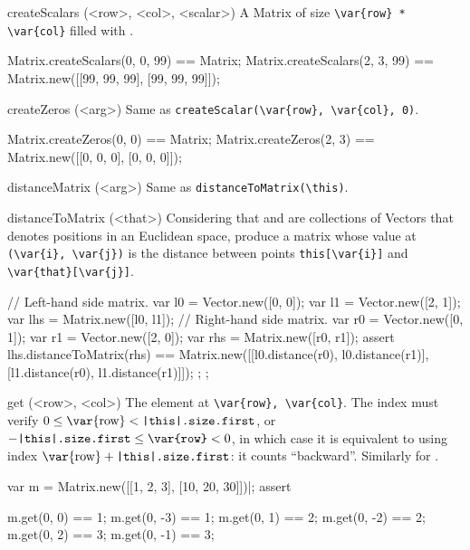 \begin{urbiscriptapi}
\item[createScalars](<row>, <col>, <scalar>)%
  A Matrix of size \lstinline|\var{row} * \var{col}| filled with
  .
\begin{urbiassert}
Matrix.createScalars(0, 0, 99) == Matrix;
Matrix.createScalars(2, 3, 99) == Matrix.new([[99, 99, 99], [99, 99, 99]]);
\end{urbiassert}

\item[createZeros](<arg>)%
  Same as \lstinline|createScalar(\var{row}, \var{col}, 0)|.
\begin{urbiassert}
Matrix.createZeros(0, 0) == Matrix;
Matrix.createZeros(2, 3) == Matrix.new([[0, 0, 0], [0, 0, 0]]);
\end{urbiassert}

\item[distanceMatrix](<arg>)%
  Same as \lstinline|distanceToMatrix(\this)|.
\begin{urbiassert}

\end{urbiassert}

\item[distanceToMatrix](<that>)%
  Considering that \this and \that are collections of Vectors that denotes
  positions in an Euclidean space, produce a matrix whose value at
  \lstinline|(\var{i}, \var{j})| is the distance between points
  \lstinline|this[\var{i}]| and \lstinline|\var{that}[\var{j}]|.
\begin{urbiscript}
{
  // Left-hand side matrix.
  var l0 = Vector.new([0, 0]);  var l1 = Vector.new([2, 1]);
  var lhs = Matrix.new([l0, l1]);
  // Right-hand side matrix.
  var r0 = Vector.new([0, 1]);  var r1 = Vector.new([2, 0]);
  var rhs = Matrix.new([r0, r1]);
  assert
  {
    lhs.distanceToMatrix(rhs)
      == Matrix.new([[l0.distance(r0), l0.distance(r1)],
                     [l1.distance(r0), l1.distance(r1)]]);
  };
};
\end{urbiscript}

\item[get](<row>, <col>)%
  The element at \lstinline|\var{row}, \var{col}|.  The index  must
  verify $0 \le \textrm{\var{row}} < \texttt{\this.size.first}$, or
  $-\texttt{\this.size.first} \le \texttt{\var{row}} < 0$, in which case it
  is equivalent to using index $\textrm{\var{row}} +
  \texttt{\this.size.first}$: it counts ``backward''.  Similarly for
  .
\begin{urbiscript}
var m = Matrix.new([[1, 2, 3], [10, 20, 30]])|;
assert
{
  m.get(0, 0) == 1;   m.get(0, -3) == 1;
  m.get(0, 1) == 2;   m.get(0, -2) == 2;
  m.get(0, 2) == 3;   m.get(0, -1) == 3;

}
\end{urbiscript}
\end{urbiscriptapi}
